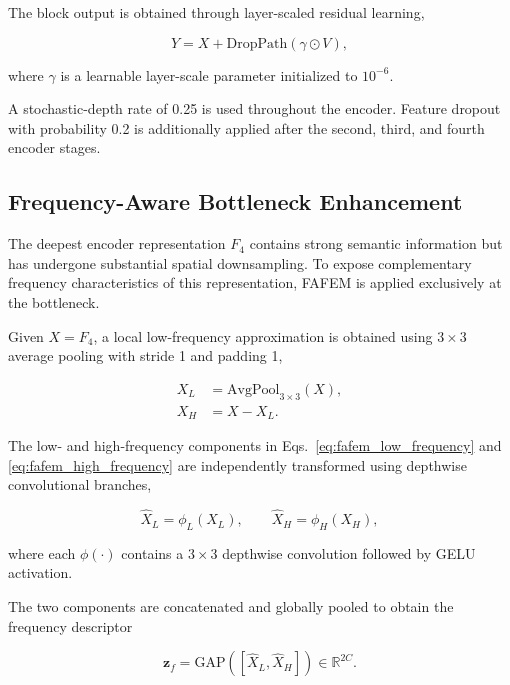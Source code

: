 The block output is obtained through layer-scaled residual learning,

\begin{equation}
Y=X+\mathrm{DropPath}(\gamma\odot V),
\label{eq:convnext_residual}
\end{equation}

where $\gamma$ is a learnable layer-scale parameter initialized to $10^{-6}$.

A stochastic-depth rate of 0.25 is used throughout the encoder. Feature dropout with probability 0.2 is additionally applied after the second, third, and fourth encoder stages.

\subsection{Frequency-Aware Bottleneck Enhancement}

The deepest encoder representation $F_4$ contains strong semantic information but has undergone substantial spatial downsampling. To expose complementary frequency characteristics of this representation, FAFEM is applied exclusively at the bottleneck.

Given $X=F_4$, a local low-frequency approximation is obtained using $3\times3$ average pooling with stride 1 and padding 1,

\begin{align}
X_L&=\mathrm{AvgPool}_{3\times3}(X),
\label{eq:fafem_low_frequency}\\
X_H&=X-X_L.
\label{eq:fafem_high_frequency}
\end{align}

The low- and high-frequency components in Eqs.~\eqref{eq:fafem_low_frequency} and \eqref{eq:fafem_high_frequency} are independently transformed using depthwise convolutional branches,

\begin{equation}
\widehat{X}_L=\phi_L(X_L),
\qquad
\widehat{X}_H=\phi_H(X_H),
\label{eq:fafem_frequency_transforms}
\end{equation}

where each $\phi(\cdot)$ contains a $3\times3$ depthwise convolution followed by GELU activation.

The two components are concatenated and globally pooled to obtain the frequency descriptor

\begin{equation}
\mathbf{z}_f
=
\mathrm{GAP}
\left(
[\widehat{X}_L,\widehat{X}_H]
\right)
\in\mathbb{R}^{2C}.
\label{eq:frequency_descriptor}
\end{equation}

